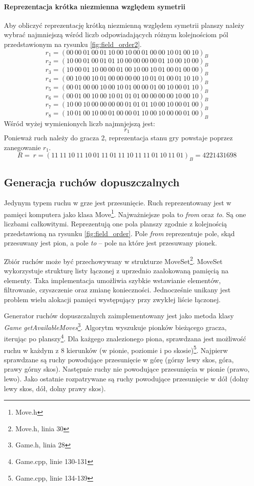 \documentclass{scrartcl}
\begin{document}
\paragraph{Reprezentacja krótka niezmienna względem symetrii} Aby obliczyć reprezentację krótką niezmienną względem symetrii planszy
należy wybrać najmniejszą wśród liczb odpowiadających różnym 
kolejnościom pól przedstawionym na rysunku \ref{fig:field_order2}.
\[r_1 = (00\ 00\ 01\ 00\ 01\ 10\ 00\ 10\ 00\ 01\ 00\ 00\ 10\ 01\ 00\ 10
)_B \]
\[r_2 = (10\ 00\ 01\ 00\ 01\ 01\ 10\ 00\ 00\ 00\ 00\ 01\ 10\ 00\ 10\ 00
)_B\]
\[r_3 = (10\ 00\ 01\ 10\ 00\ 00\ 01\ 00\ 10\ 00\ 10\ 01\ 00\ 01\ 00\ 00
)_B\]
\[r_4 = (00\ 10\ 00\ 10\ 01\ 00\ 00\ 00\ 00\ 10\ 01\ 01\ 00\ 01\ 10\ 10
)_B\]
\[r_5 = (00\ 01\ 00\ 00\ 10\ 00\ 10\ 01\ 00\ 00\ 01\ 00\ 10\ 00\ 01\ 10
)_B\]
\[r_6 = (00\ 01\ 00\ 10\ 00\ 10\ 01\ 01\ 01\ 00\ 00\ 00\ 00\ 10\ 00\ 10
)_B\]
\[r_7 = (10\ 00\ 10\ 00\ 00\ 00\ 00\ 01\ 01\ 01\ 10\ 00\ 10\ 00\ 01\ 00
)_B\]
\[r_8 = (10\ 01\ 00\ 10\ 00\ 01\ 00\ 00\ 01\ 10\ 00\ 10\ 00\ 00\ 01\ 00
)_B\]
Wśród wyżej wymienionych liczb najmnjejszą jest:
\[r_1\]
Ponieważ ruch należy do gracza 2, reprezentacja stanu gry powstaje
poprzez zanegowanie $r_1$.
\[R = ~r = (11\ 11\ 10\ 11\ 10\ 01\ 11\ 01\ 11\ 10\ 11\ 11\ 01\ 10\ 11\ 01)_B
= 4221431698 \]

\subsection{Generacja ruchów dopuszczalnych}

Jedynym typem ruchu w grze jest przesunięcie. 
Ruch reprezentowany jest w pamięci komputera jako klasa Move\footnote{
Move.h}. Najważniejsze pola to \emph{from} oraz \emph{to}. Są one
liczbami
całkowitymi. Reprezentują one pola planszy zgodnie z kolejnością 
przedstawioną na rysunku \ref{fig:field_order}. Pole \emph{from}
reprezentuje pole, skąd przesuwany jest pion, a pole \emph{to}
-- pole na które jest przesuwany pionek.

Zbiór ruchów może być przechowywany w strukturze MoveSet\footnote{
Move.h, linia 30}. MoveSet wykorzystuje strukturę listy łączonej
z uprzednio zaalokowaną pamięcią na elementy. Taka implementacja 
umożliwia szybkie wstawianie elementów, filtrowanie, czyszczenie
oraz zmianę konieczności. Jednocześnie unikany jest problem 
wielu alokacji pamięci występujący przy zwykłej liście łączonej.

Generator ruchów dopuszczalnych zaimplementowany jest jako metoda 
klasy \emph{Game} \emph{getAvailableMoves}\footnote{Game.h, linia 28}.
Algorytm wyszukuje pionków bieżącego gracza, iterując po
planszy\footnote{Game.cpp, linie 130-131}. Dla każgego znalezionego
piona, sprawdzana jest możliwość ruchu w każdym z 8 kierunków
(w pionie, poziomie i po skosie)\footnote{Game.cpp, linie 134-139}.
Najpierw sprawdzane są ruchy powodujące przesunięcie w górę 
(górny lewy skos, góra, prawy górny skos). Następnie ruchy nie 
powodujące przesunięcia w pionie (prawo, lewo). Jako ostatnie 
rozpatrywane są ruchy powodujące przesunięcie w dół (dolny lewy
skos, dół, dolny prawy skos).
\end{document}

